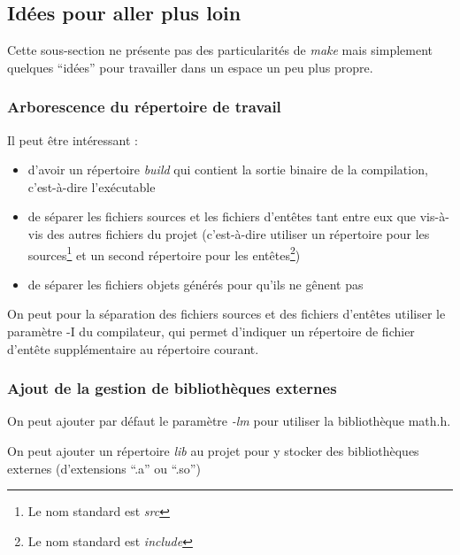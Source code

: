 \documentclass[../../../main.tex]{subfiles}
\begin{document}
\subsection{Idées pour aller plus loin}
Cette sous-section ne présente pas des particularités de \textit{make} mais simplement quelques ``idées'' pour travailler dans un espace un peu plus propre.
\subsubsection{Arborescence du répertoire de travail}
Il peut être intéressant :
\begin{itemize}
	\item d'avoir un répertoire \textit{build} qui contient la sortie binaire de la compilation, c'est-à-dire l'exécutable
	\item de séparer les fichiers sources et les fichiers d'entêtes tant entre eux que vis-à-vis des autres fichiers du projet (c'est-à-dire utiliser un répertoire pour les sources\footnote{Le nom standard est \textit{src}} et un second répertoire pour les entêtes\footnote{Le nom standard est \textit{include}})
	\item de séparer les fichiers objets générés pour qu'ils ne gênent pas
\end{itemize}
On peut pour la séparation des fichiers sources et des fichiers d'entêtes utiliser le paramètre \textsf{-I} du compilateur, qui permet d'indiquer un répertoire de fichier d'entête supplémentaire au répertoire courant.
\subsubsection{Ajout de la gestion de bibliothèques externes}
On peut ajouter par défaut le paramètre \textit{-lm} pour utiliser la bibliothèque \textsf{math.h}.
 
On peut ajouter un répertoire \textit{lib} au projet pour y stocker des bibliothèques externes (d'extensions ``.a'' ou ``.so'')
\end{document}
